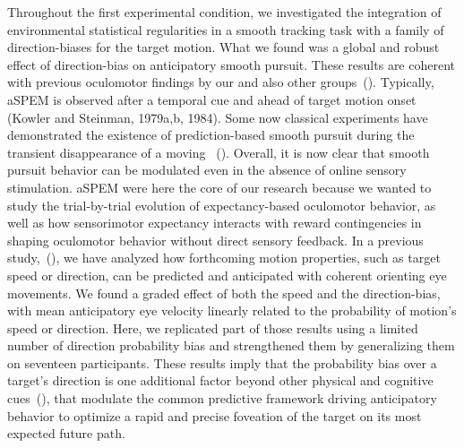 \documentclass[profile,final,english, draft]{article}%
\newcommand{\citep}[1]{(\cite{#1})}
\begin{document}
Throughout the first experimental condition,
we investigated the integration of environmental statistical regularities
in a smooth tracking task with
a family of direction-biases for the target motion.
What we found was a global and robust effect of direction-bias
on anticipatory smooth pursuit.
These results are coherent with previous oculomotor findings
by our and also other groups~\citep{Montagnini2010, SantosKowler2017}.
Typically, aSPEM is observed after a temporal cue and
ahead of target motion onset (Kowler and Steinman, 1979a,b, 1984).
Some now classical experiments have demonstrated the existence of prediction-based smooth pursuit during
the transient disappearance of a moving ~\citep{Badler2006,BeckerFuchs, 1985}.
Overall, it is now clear that smooth pursuit behavior
can be modulated even in the absence of online sensory stimulation.
aSPEM were here the core of our research because
we wanted to study the trial-by-trial evolution
of expectancy-based oculomotor behavior,
as well as how sensorimotor expectancy interacts
with reward contingencies in shaping oculomotor behavior without direct sensory feedback.
In a previous study,~\citep{SoutoMontagniniMasson2008, Montagnini2010},
we have analyzed how forthcoming motion properties,
such as target speed or direction, can be
predicted and anticipated with coherent orienting eye movements.
We found a graded effect of both the speed and the direction-bias,
with mean anticipatory eye velocity
linearly related to the probability of motion's speed or direction.
Here, we replicated part of those results
using a limited number of direction probability bias and
strengthened them by generalizing them on seventeen participants.
These results imply that the probability bias over a target's direction is
one additional factor beyond other physical and cognitive cues~\citep{Kowler2014, SantosKowler2017},
that modulate the common predictive framework
driving anticipatory behavior to optimize a rapid and
precise foveation of the target on its most expected future path.

\end{document}
